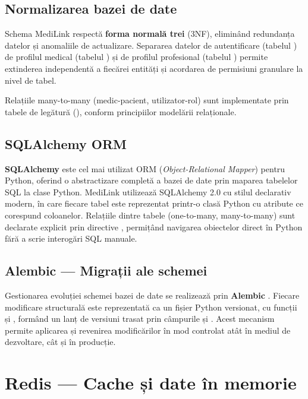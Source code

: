 \subsection{Normalizarea bazei de date}

Schema MediLink respectă \textbf{forma normală trei} (3NF), eliminând redundanța datelor și anomaliile de actualizare. Separarea datelor de autentificare (tabelul ) de profilul medical (tabelul ) și de profilul profesional (tabelul ) permite extinderea independentă a fiecărei entități și acordarea de permisiuni granulare la nivel de tabel.

Relațiile many-to-many (medic-pacient, utilizator-rol) sunt implementate prin tabele de legătură (), conform principiilor modelării relaționale.

\subsection{SQLAlchemy ORM}

\textbf{SQLAlchemy} \cite{sqlalchemy2024} este cel mai utilizat ORM (\textit{Object-Relational Mapper}) pentru Python, oferind o abstractizare completă a bazei de date prin maparea tabelelor SQL la clase Python. MediLink utilizează SQLAlchemy 2.0 cu stilul declarativ modern, în care fiecare tabel este reprezentat printr-o clasă Python cu atribute ce corespund coloanelor. Relațiile dintre tabele (one-to-many, many-to-many) sunt declarate explicit prin directive , permițând navigarea obiectelor direct în Python fără a scrie interogări SQL manuale.

\subsection{Alembic --- Migrații ale schemei}

Gestionarea evoluției schemei bazei de date se realizează prin \textbf{Alembic} \cite{alembic2024}. Fiecare modificare structurală este reprezentată ca un fișier Python versionat, cu funcții  și , formând un lanț de versiuni trasat prin câmpurile  și . Acest mecanism permite aplicarea și revenirea modificărilor în mod controlat atât în mediul de dezvoltare, cât și în producție.

\section{Redis --- Cache și date în memorie}

